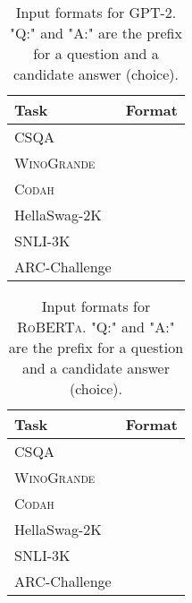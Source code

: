 \documentclass[11pt,a4paper]{article}
\newcommand{\winogrande}{\textsc{WinoGrande}\xspace}
\newcommand{\codah}{\textsc{Codah}\xspace}
\newcommand{\roberta}{\textsc{RoBERTa}\xspace}
\begin{document}
\begin{table*}[]
\centering
\footnotesize
\begin{tabular}{ll}
\bf Task                     & \bf Format \\ \toprule
CSQA                 &           \\
\winogrande &   \\ 
\codah                     &     \\ 
HellaSwag-2K               &      \\ 
SNLI-3K  & \\
ARC-Challenge & \\
\bottomrule
\end{tabular}
\caption{ Input formats for GPT-2. "Q:" and "A:" are the prefix for a question and a candidate answer (choice). }
\label{app:gen_input_format}
\end{table*}


\begin{table*}[]
\centering
\footnotesize
\begin{tabular}{ll}
\bf Task                     & \bf Format \\ \toprule
CSQA                 &           \\
\winogrande &   \\ 
\codah                     &     \\ 
HellaSwag-2K               &      \\ 
SNLI-3K &   \\
ARC-Challenge & \\
\bottomrule
\end{tabular}
\caption{ Input formats for \roberta. "Q:" and "A:" are the prefix for a question and a candidate answer (choice). }
\label{app:task_input_format}
\end{table*}
\end{document}
